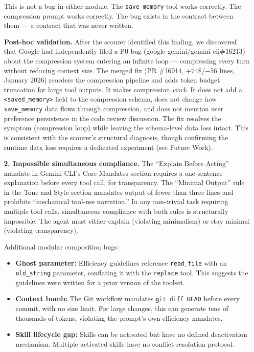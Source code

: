 This is not a bug in either module. The \texttt{save\_memory} tool works
correctly. The compression prompt works correctly. The bug exists in the
contract between them --- a contract that was never written.

\textbf{Post-hoc validation.} After the scourer identified this finding,
we discovered that Google had independently filed a P0 bug
(google-gemini/gemini-cli\#16213) about the compression system entering
an infinite loop --- compressing every turn without reducing context
size. The merged fix (PR \#16914, +748/−56 lines, January 2026) reorders
the compression pipeline and adds token budget truncation for large tool
outputs. It makes compression \emph{work}. It does not add a
\texttt{<saved\_memory>} field to the compression
schema, does not change how \texttt{save\_memory} data flows through
compression, and does not mention user preference persistence in the
code review discussion. The fix resolves the symptom (compression loop)
while leaving the schema-level data loss intact. This is consistent with
the scourer's structural diagnosis, though confirming the runtime data
loss requires a dedicated experiment (see Future Work).

\textbf{2. Impossible simultaneous compliance.} The ``Explain Before
Acting'' mandate in Gemini CLI's Core Mandates section requires a
one-sentence explanation before every tool call, for transparency. The
``Minimal Output'' rule in the Tone and Style section mandates output of
fewer than three lines and prohibits ``mechanical tool-use narration.''
In any non-trivial task requiring multiple tool calls, simultaneous
compliance with both rules is structurally impossible. The agent must
either explain (violating minimalism) or stay minimal (violating
transparency).

Additional modular composition bugs:

\begin{itemize}
\tightlist
\item
  \textbf{Ghost parameter:} Efficiency guidelines reference
  \texttt{read\_file} with an \texttt{old\_string} parameter, conflating
  it with the \texttt{replace} tool. This suggests the guidelines were
  written for a prior version of the toolset.
\item
  \textbf{Context bomb:} The Git workflow mandates
  \texttt{git diff HEAD} before every commit, with no size limit. For
  large changes, this can generate tens of thousands of tokens, violating
  the prompt's own efficiency mandates.
\item
  \textbf{Skill lifecycle gap:} Skills can be activated but have no
  defined deactivation mechanism. Multiple activated skills have no
  conflict resolution protocol.
\end{itemize}

